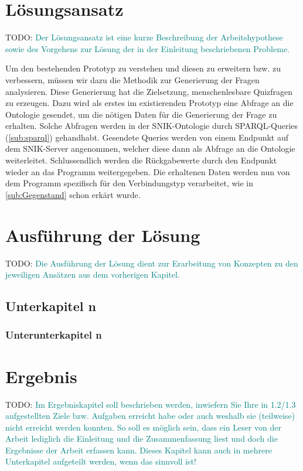 \documentclass[headsepline,titlepage,ngerman,twoside,12pt]{report}
\newcommand\todo[1]{TODO: \textcolor{teal}{#1}}
\begin{document}
\chapter{Lösungsansatz}
\label{ch:Lösungsansatz}
\todo{Der Lösungsansatz ist eine kurze Beschreibung der Arbeitshypothese sowie des Vorgehens zur Lösung der in der Einleitung beschriebenen Probleme.}

Um den bestehenden Prototyp zu verstehen und diesen zu erweitern bzw. zu verbessern, müssen wir dazu die Methodik zur Generierung der Fragen analysieren.
Diese Generierung hat die Zielsetzung, menschenlesbare Quizfragen zu erzeugen.
Dazu wird als erstes im existierenden Prototyp eine Abfrage an die Ontologie gesendet, um die nötigen Daten für die Generierung der Frage zu erhalten.
Solche Abfragen werden in der SNIK-Ontologie durch SPARQL-Queries (\cref{sub:sparql}) gehandhabt. Gesendete Queries werden von einem Endpunkt auf dem SNIK-Server angenommen, welcher diese dann als Abfrage an die Ontologie weiterleitet. Schlussendlich werden die Rückgabewerte durch den Endpunkt wieder an das Programm weitergegeben.
Die erhaltenen Daten werden nun von dem Programm spezifisch für den Verbindungstyp verarbeitet, wie in \cref{sub:Gegenstand} schon erkärt wurde.

\chapter{Ausführung der Lösung}
\todo{Die Ausführung der Lösung dient zur Erarbeitung von Konzepten zu den jeweiligen Ansätzen aus dem vorherigen Kapitel.}

\section{Unterkapitel n}

\subsection{Unterunterkapitel n}

\chapter{Ergebnis}
\todo{
Im Ergebniskapitel soll beschrieben werden, inwiefern Sie Ihre in 1.2/1.3 aufgestellten Ziele bzw. Aufgaben erreicht habe oder auch weshalb sie (teilweise) nicht erreicht werden konnten.
So soll es möglich sein, dass ein Leser von der Arbeit lediglich die Einleitung und die Zusammenfassung liest und doch die Ergebnisse der Arbeit erfassen kann.
Dieses Kapitel kann auch in mehrere Unterkapitel aufgeteilt werden, wenn das sinnvoll ist!
}
\end{document}
